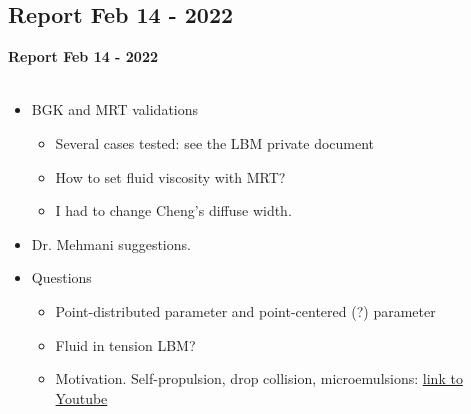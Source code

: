 \documentclass{beamer}
\begin{document}
	\subsection{Report Feb 14 - 2022}
	\label{}
	\justifying
	\begin{frame}
		\textbf{Report Feb 14 - 2022}\\~\\
		\begin{itemize}
			
			\item BGK and MRT validations
			\begin{itemize}
				\item Several cases tested: see the LBM private document
				\item How to set fluid viscosity with MRT?
				\item I had to change Cheng's diffuse width.
			\end{itemize}
			
			\item Dr. Mehmani suggestions.
			\item Questions
			\begin{itemize}
				\item Point-distributed parameter and point-centered (?) parameter
				\item Fluid in tension LBM?
				\item Motivation. Self-propulsion, drop collision, microemulsions: \href{https://www.youtube.com/watch?v=arpGntfrg4s}{link to Youtube}
			\end{itemize}
			
		\end{itemize}
	\end{frame}
\end{document}
